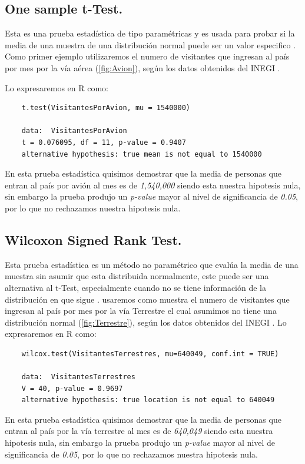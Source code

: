 \documentclass[]{article}
\begin{document}
\subsection{One sample t-Test.}
Esta es una prueba estadística de tipo paramétricas y es usada para probar si la media de una muestra de una distribución normal puede ser un valor especifico \cite{Articulo_0}.
Como primer ejemplo utilizaremos el numero de visitantes que ingresan al país por mes por la vía aérea (\autoref{fig:Avion}), según los datos obtenidos del INEGI \cite{inegi}.

Lo expresaremos en R como:
  \begin{lstlisting}
	t.test(VisitantesPorAvion, mu = 1540000)
	
	data:  VisitantesPorAvion
	t = 0.076095, df = 11, p-value = 0.9407
	alternative hypothesis: true mean is not equal to 1540000
   \end{lstlisting}
   
   En esta prueba estadística quisimos demostrar que la media de personas que entran al país por avión al mes es de \textit{1,540,000} siendo esta nuestra hipotesis nula, sin embargo la prueba produjo un \textit{p-value} mayor al nivel de significancia de \textit{0.05}, por lo que no rechazamos nuestra hipotesis nula.

\subsection{Wilcoxon Signed Rank Test.}
Esta prueba estadística es un método no paramétrico que evalúa la media de una muestra sin asumir que esta distribuida normalmente, este puede ser una alternativa al t-Test, especialmente cuando no se tiene información de la distribución en que sigue \cite{Articulo_0}.
usaremos como muestra el numero de visitantes que ingresan al país por mes por la vía Terrestre el cual asumimos no tiene una distribución normal (\autoref{fig:Terrestre}), según los datos obtenidos del INEGI \cite{inegi}.
Lo expresaremos en R como:
  \begin{lstlisting}
	wilcox.test(VisitantesTerrestres, mu=640049, conf.int = TRUE)
	
	data:  VisitantesTerrestres
	V = 40, p-value = 0.9697
	alternative hypothesis: true location is not equal to 640049
   \end{lstlisting}
   
 En esta prueba estadística quisimos demostrar que la media de personas que entran al país por la vía terrestre al mes es de \textit{640,049} siendo esta nuestra hipotesis nula, sin embargo la prueba produjo un \textit{p-value} mayor al nivel de significancia de \textit{0.05}, por lo que no rechazamos nuestra hipotesis nula.
\end{document}
